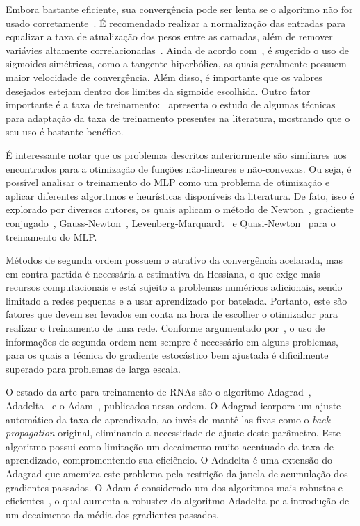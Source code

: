\documentclass[conference]{IEEEtran}
\begin{document}
	Embora bastante eficiente, sua convergência pode ser lenta se o algoritmo não for usado corretamente~\cite{lecun1993efficient}. É recomendado realizar a normalização das entradas para equalizar a taxa de atualização dos pesos entre as camadas, além de remover variávies altamente correlacionadas~\cite{lecun2012efficient}. Ainda de acordo com~\cite{lecun2012efficient}, é sugerido o uso de sigmoides simétricas, como a tangente hiperbólica, as quais geralmente possuem maior velocidade de convergência. Além disso, é importante que os valores desejados estejam dentro dos limites da sigmoide escolhida. Outro fator importante é a taxa de treinamento:~\cite{magoulas1999improving} apresenta o estudo de algumas técnicas para adaptação da taxa de treinamento presentes na literatura, mostrando que o seu uso é bastante benéfico. 
	
	É interessante notar que os problemas descritos anteriormente são similiares aos encontrados para a otimização de funções não-lineares e não-convexas. Ou seja, é possível analisar o treinamento do MLP como um problema de otimização e aplicar diferentes algoritmos e heurísticas disponíveis da literatura. De fato, isso é explorado por diversos autores, os quais aplicam o método de Newton~\cite{becker1988improving}, gradiente conjugado~\cite{johansson1991backpropagation}, Gauss-Newton~\cite{battiti1992first}, Levenberg-Marquardt~\cite{hagan1994training} e Quasi-Newton~\cite{robitaille1996modified} para o treinamento do MLP.  
	
	Métodos de segunda ordem possuem o atrativo da convergência acelarada, mas em contra-partida é necessária a estimativa da Hessiana, o que exige mais recursos computacionais e está sujeito a problemas numéricos adicionais, sendo limitado a redes pequenas e a usar aprendizado por batelada. Portanto, este são fatores que devem ser levados em conta na hora de escolher o otimizador para realizar o treinamento de uma rede. Conforme argumentado por~\cite{lecun2012efficient}, o uso de informações de segunda ordem nem sempre é necessário em alguns problemas, para os quais a técnica do gradiente estocástico bem ajustada é dificilmente superado para problemas de larga escala.
	
	O estado da arte para treinamento de RNAs são o algoritmo Adagrad~\cite{duchi2011adaptive}, Adadelta~\cite{zeiler2012adadelta} e o Adam~\cite{kingma2014adam}, publicados nessa ordem. O Adagrad icorpora um ajuste automático da taxa de aprendizado, ao invés de mantê-las fixas como o \textit{back-propagation} original, eliminando a necessidade de ajuste deste parâmetro. Este algoritmo possui como limitação um decaimento muito acentuado da taxa de aprendizado, compromentendo sua eficiêncio. O Adadelta é uma extensão do Adagrad que amemiza este problema pela restrição da janela de acumulação dos gradientes passados. O Adam é considerado um dos algoritmos mais robustos e eficientes~\cite{ruder2016overview}, o qual aumenta a robustez do algoritmo Adadelta pela introdução de um decaimento da média dos gradientes passados. 
	
\end{document}
